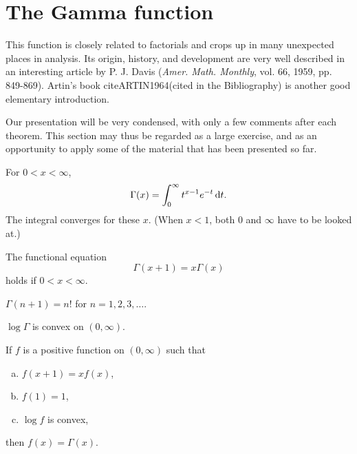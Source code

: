 \section{The Gamma function}

This function is closely related to factorials and crops up in many unexpected places in analysis.
Its origin, history, and development are very well described in an interesting article
by P. J. Davis (\emph{Amer. Math. Monthly}, vol. 66, 1959, pp. 849-869).
Artin's book cite{ARTIN1964}(cited in the Bibliography) is another good elementary introduction.

Our presentation will be very condensed, with only a few comments after each theorem.
This section may thus be regarded as a large exercise,
and as an opportunity to apply some of the material that has been presented so far.


\begin{mydef}
    \label{mydef:8.17}
    For $0 < x < \infty$,
    \begin{equation}
        \label{eq:8.93}
        \Gamma(x) = \int_{0}^{\infty} t^{x-1} e^{-t} \d t.
    \end{equation}
    The integral converges for these $x$.
    (When $x < 1$, both $0$ and $\infty$ have to be looked at.)
\end{mydef}


\begin{thm}
    \label{thm:8.18}
    \begin{asparaenum}[(a)]
        \item The functional equation
        \begin{equation*}
            \Gamma(x+1) = x\Gamma(x)
        \end{equation*}
        holds if $0 < x < \infty$.
        \item $\Gamma(n+1)=n!$ for $n=1,2,3,\dots$.
        \item $\log \Gamma$ is convex on $(0,\infty)$.
    \end{asparaenum}
\end{thm}


\begin{thm}
    \label{thm:8.19}
    If $f$ is a positive function on $(0, \infty)$ such that
    \begin{enumerate}[(a)]
        \item $f(x+1)=xf(x)$,
        \item $f(1)=1$,
        \item $\log f$ is convex,
    \end{enumerate}
    then $f(x) = \Gamma(x)$.
\end{thm}

